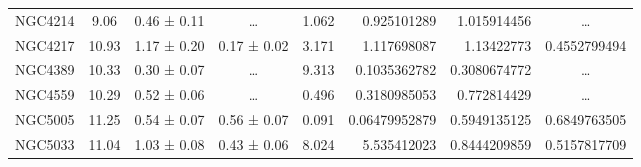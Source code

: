 \documentclass[reprint,%
 amsmath,amssymb,
 aps,
]{revtex4-1}
\begin{document}
\begin{table}[]
\begin{tabular}{cccccrrc}
\rowcolor[HTML]{F3F3F3} 
NGC4214              & 9.06                      & 0.46 ± 0.11           & …                      & 1.062                                                        & 0.925101289                                                           & 1.015914456                                                           & …                                                             \\
\rowcolor[HTML]{F3F3F3} 
NGC4217              & 10.93                     & 1.17 ± 0.20           & 0.17 ± 0.02            & 3.171                                                        & 1.117698087                                                           & 1.13422773                                                            & \multicolumn{1}{r}{\cellcolor[HTML]{F3F3F3}0.4552799494}      \\
\rowcolor[HTML]{F3F3F3} 
NGC4389              & 10.33                     & 0.30 ± 0.07           & …                      & 9.313                                                        & 0.1035362782                                                          & 0.3080674772                                                          & …                                                             \\
\rowcolor[HTML]{F3F3F3} 
NGC4559              & 10.29                     & 0.52 ± 0.06           & …                      & 0.496                                                        & 0.3180985053                                                          & 0.772814429                                                           & …                                                             \\
\rowcolor[HTML]{F3F3F3} 
NGC5005              & 11.25                     & 0.54 ± 0.07           & 0.56 ± 0.07            & 0.091                                                        & 0.06479952879                                                         & 0.5949135125                                                          & \multicolumn{1}{r}{\cellcolor[HTML]{F3F3F3}0.6849763505}      \\
\rowcolor[HTML]{F3F3F3} 
NGC5033              & 11.04                     & 1.03 ± 0.08           & 0.43 ± 0.06            & 8.024                                                        & 5.535412023                                                           & 0.8444209859                                                          & \multicolumn{1}{r}{\cellcolor[HTML]{F3F3F3}0.5157817709}      \\

\end{tabular}
\end{table}
\end{document}
